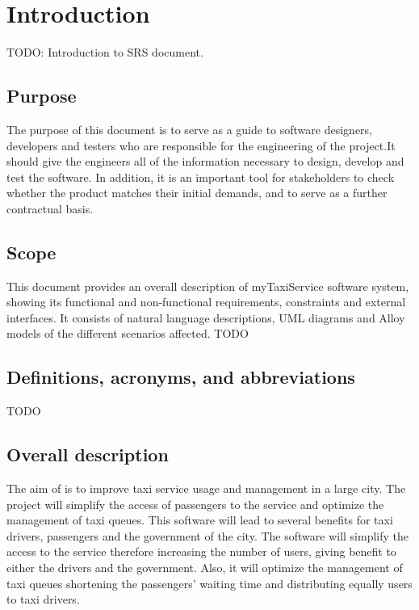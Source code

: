 \section{Introduction}      %
TODO: Introduction to \myTaxiService{} SRS document.
\subsection{Purpose}
The purpose of this document is to serve as a guide to software designers, developers and testers who are responsible for the engineering of the \myTaxiService{} project.\newline It should give the engineers all of the information necessary to design, develop and test the software.
In addition, it is an important tool for \myTaxiService{} stakeholders to check whether the product matches their initial demands, and to serve as a further contractual basis.
\subsection{Scope}
This document provides an overall description of myTaxiService software system, showing its functional and non-functional requirements, constraints and external interfaces.
It consists of natural language descriptions, UML diagrams and Alloy models of the different scenarios affected.
TODO
\subsection{Definitions, acronyms, and abbreviations}
TODO
\subsection{Overall description}
The aim of \myTaxiService{} is to improve taxi service usage and management in a large city.
The project will simplify the access of passengers to the service and optimize the management of taxi queues.
This software will lead to several benefits for taxi drivers, passengers and the government of the city.
The software will simplify the access to the service therefore increasing the number of users, giving benefit to either the drivers and the government.
Also, it will optimize the management of taxi queues shortening the passengers’ waiting time and distributing equally users to taxi drivers.
